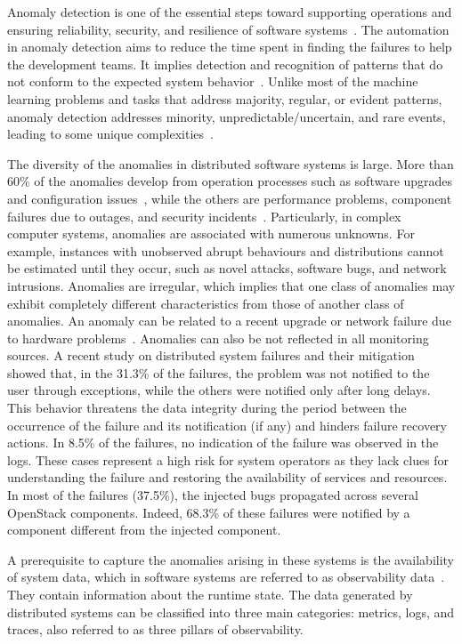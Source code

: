 Anomaly detection is one of the essential steps toward supporting operations and ensuring reliability, security, and resilience of software systems~\cite{yeanomalycloud, doelitzscheranomalyclouds}. The automation in anomaly detection aims to reduce the time spent in finding the failures to help the development teams.
It implies detection and recognition of patterns that do not conform to the expected system behavior~\cite{chandola2009anomaly}. 
Unlike most of the machine learning problems and tasks that address majority, regular, or evident patterns, anomaly detection addresses minority, unpredictable/uncertain, and rare events, leading to some unique complexities~\cite{pang2020deep}.

The diversity of the anomalies in distributed software systems is large. More than 60\% of the anomalies develop from operation processes such as software upgrades and configuration issues~\cite{gunawi2014bugs}, while the others are performance problems, component failures due to outages, and security incidents~\cite{nedelkoski2019anomaly}. Particularly, in complex computer systems, anomalies are associated with numerous unknowns. For example, instances with unobserved abrupt behaviours and distributions cannot be estimated until they occur, such as novel attacks, software bugs, and network intrusions. Anomalies are irregular, which implies that one class of anomalies may exhibit completely different characteristics from those of another class of anomalies. An anomaly can be related to a recent upgrade or network failure due to hardware problems~\cite{sillito2020failures}. Anomalies can also be not reflected in all monitoring sources. A recent study on distributed system failures and their mitigation~\cite{sillito2020failures} showed that, in the 31.3\% of the failures, the problem was not notified to the user through exceptions, while the others were notified only after long delays. This behavior threatens the data integrity during the period between the occurrence of the failure and its notification (if any) and hinders failure recovery actions. In 8.5\% of the failures, no indication of the failure was observed in the logs. These cases represent a high risk for system operators as they lack clues for understanding the failure and restoring the availability of services and resources. In most of the failures (37.5\%), the injected bugs propagated across several OpenStack components. Indeed, 68.3\% of these failures were notified by a component different from the injected component. 

A prerequisite to capture the anomalies arising in these systems is the availability of system data, which in software systems are referred to as observability data~\cite{sridharan2018distributed}. They contain information about the runtime state. The data generated by distributed systems can be classified into three main categories: metrics, logs, and traces, also referred to as three pillars of observability. 

